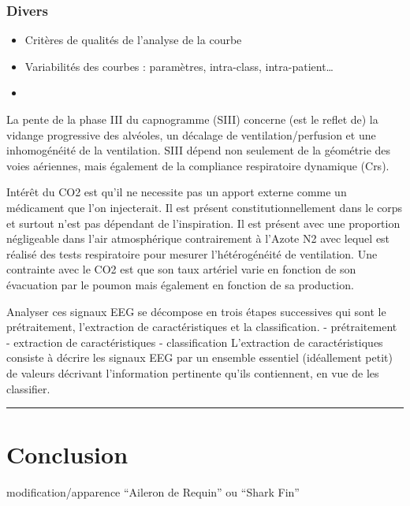 \documentclass[12pt,]{article}
\begin{document}
\hypertarget{divers}{%
\subsubsection{Divers}\label{divers}}

\begin{itemize}
\item
  Critères de qualités de l'analyse de la courbe
\item
  Variabilités des courbes : paramètres, intra-class,
  intra-patient\ldots{}
\item
\end{itemize}

La pente de la phase III du capnogramme (SIII) concerne (est le reflet
de) la vidange progressive des alvéoles, un décalage de
ventilation/perfusion et une inhomogénéité de la ventilation. SIII
dépend non seulement de la géométrie des voies aériennes, mais également
de la compliance respiratoire dynamique (Crs).

Intérêt du CO2 est qu'il ne necessite pas un apport externe comme un
médicament que l'on injecterait. Il est présent constitutionnellement
dans le corps et surtout n'est pas dépendant de l'inspiration. Il est
présent avec une proportion négligeable dans l'air atmosphérique
contrairement à l'Azote N2 avec lequel est réalisé des tests
respiratoire pour mesurer l'hétérogénéité de ventilation. Une contrainte
avec le CO2 est que son taux artériel varie en fonction de son
évacuation par le poumon mais également en fonction de sa production.

Analyser ces signaux EEG se décompose en trois étapes successives qui
sont le prétraitement, l'extraction de caractéristiques et la
classification. - prétraitement - extraction de caractéristiques -
classification L'extraction de caractéristiques consiste à décrire les
signaux EEG par un ensemble essentiel (idéallement petit) de valeurs
décrivant l'information pertinente qu'ils contiennent, en vue de les
classifier.

\pagebreak

\begin{center}\rule{0.5\linewidth}{0.5pt}\end{center}

\hypertarget{conclusion}{%
\section{Conclusion}\label{conclusion}}

modification/apparence ``Aileron de Requin'' ou ``Shark Fin''
\end{document}
